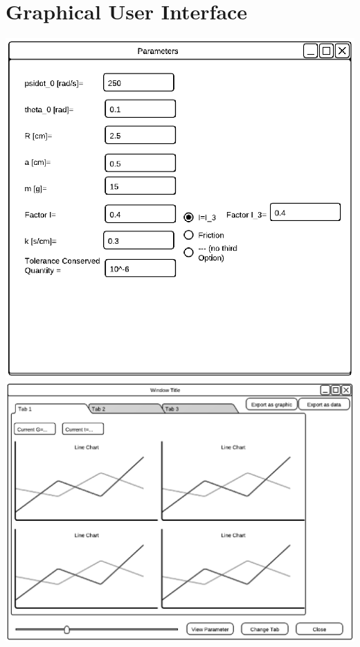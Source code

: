 \section{Graphical User Interface}
\label{sec:3.3}
\includegraphics[width=6in,keepaspectratio=true]{figures/GUIParameterInputForm.eps}
\includegraphics[width=6in,keepaspectratio=true]{figures/GUIDisplayForm.eps}

